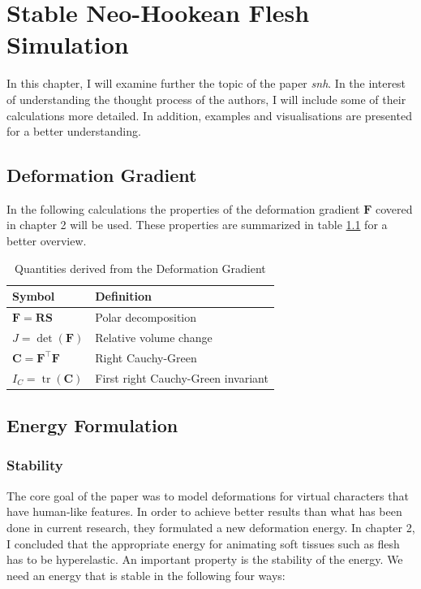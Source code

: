 \chapter{Stable Neo-Hookean Flesh Simulation} \label{c:Paper}
In this chapter, I will examine further the topic of the paper \textit{\acrshort{snh}}. In the interest of understanding the thought process of the authors, I will include some of their calculations more detailed. In addition, examples and visualisations are presented for a better understanding. 

\section{Deformation Gradient}
In the following calculations the properties of the deformation gradient $\mathbf{F}$ covered in chapter 2 will be used. These properties are summarized in table \ref{table:gradient_quantities} for a better overview.

\begin{table}[!htbp]
\centering
    \begin{tabular}{ | l | l |}
    \hline
    \textbf{Symbol} & \textbf{Definition} \\ \hline
    $\mathbf{F} = \mathbf{RS}$ & Polar decomposition \\ \hline
    $J=\operatorname{det}(\mathbf{F})$ & Relative volume change \\ \hline
    $\mathbf{C}=\mathbf{F}^\intercal \mathbf{F}$ & Right Cauchy-Green  \\ \hline	
    $I_{C}=\operatorname{tr}(\mathbf{C})$ & First right Cauchy-Green invariant \\ \hline
    \end{tabular}
    \caption[Quantities derived from the Deformation Gradient]{Quantities derived from the Deformation Gradient}
\label{table:gradient_quantities}
\end{table}


\section{Energy Formulation}
\subsection{Stability}
The core goal of the paper was to model deformations for virtual characters that have human-like features. In order to achieve better results than what has been done in current research, they formulated a new deformation energy. In chapter 2, I concluded that the appropriate energy for animating soft tissues such as flesh has to be hyperelastic. An important property is the stability of the energy. We need an energy that is stable in the following four ways:

